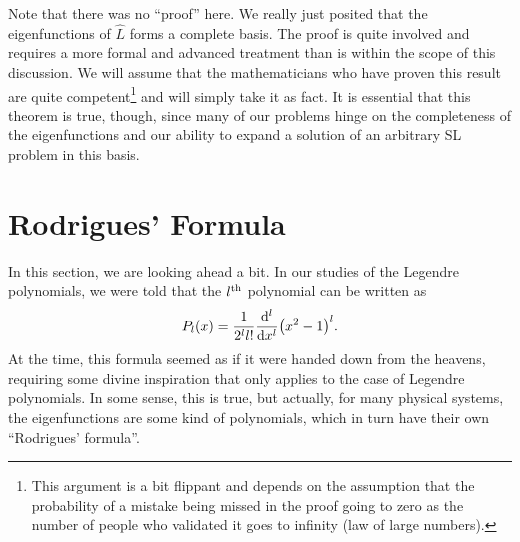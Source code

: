 Note that there was no ``proof'' here.
We really just posited that the eigenfunctions of $\hat{L}$ forms a complete basis.
The proof is quite involved and requires a more formal and advanced treatment than is within the scope of this discussion.
We will assume that the mathematicians who have proven this result are quite competent\footnote{This argument is a bit flippant and depends on the assumption that the probability of a mistake being missed in the proof going to zero as the number of people who validated it goes to infinity (law of large numbers).} and will simply take it as fact.
It is essential that this theorem is true, though, since many of our problems hinge on the completeness of the eigenfunctions and our ability to expand a solution of an arbitrary SL problem in this basis.


\section{Rodrigues' Formula}

In this section, we are looking ahead a bit.
In our studies of the Legendre polynomials, we were told that the $l^{\rm th}$ polynomial can be written as
\begin{eqnarray}
    P_{l}(x) = \frac{1}{2^{l} l!} \dv[l]{x} (x^2 - 1)^{l}
.\end{eqnarray}
At the time, this formula seemed as if it were handed down from the heavens, requiring some divine inspiration that only applies to the case of Legendre polynomials.
In some sense, this is true, but actually, for many physical systems, the eigenfunctions are some kind of polynomials, which in turn have their own ``Rodrigues' formula''.

